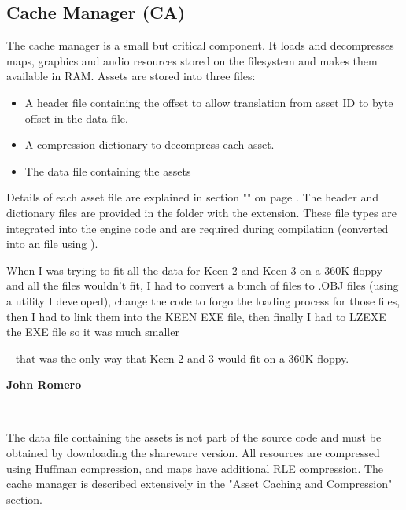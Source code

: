 \documentclass[book.tex]{subfiles}
\begin{document}
\subsection{Cache Manager (CA)}
The cache manager is a small but critical component. It loads and decompresses maps, graphics and audio resources stored on the filesystem and makes them available in RAM. Assets are stored into three files: 
\begin{itemize}
	\item A header file containing the offset to allow translation from asset ID to byte offset in the data file.
	\item A compression dictionary to decompress each asset.
	\item The data file containing the assets
\end{itemize}

\par
Details of each asset file are explained in section "" on page \pageref{section:programming}. The header and dictionary files are provided in the  folder with the  extension. These file types are integrated into the engine code and are required during compilation (converted into an  file using ). \\

\par
\begin{fancyquotes}
When I was trying to fit all the data for Keen 2 and Keen 3 on a 360K floppy and all the files wouldn't fit, I had to convert a bunch of files to .OBJ files (using a utility I developed), change the code to forgo the loading process for those files, then I had to link them into the KEEN EXE file, then finally I had to LZEXE the EXE file so it was much smaller\\ 
\par
-- that was the only way that Keen 2 and 3 would fit on a 360K floppy.\\

\par
\textbf{John Romero\protect\footnotemark}
\end{fancyquotes}\\
\addtocounter{footnote}{-1}


\pagebreak
The data file containing the assets is not part of the source code and must be obtained by downloading the shareware version. All resources are compressed using Huffman compression, and maps have additional RLE compression. The cache manager is described extensively in the "Asset Caching and Compression" section.\\
\end{document}
